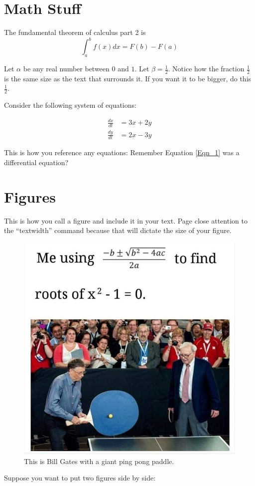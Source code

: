\documentclass[11pt]{article}
\begin{document}
\pagebreak


\section{Math Stuff}
The fundamental theorem of calculus part 2 is 
$$\int_{a}^{b} f(x) dx = F(b) - F(a) $$

\noindent Let $\alpha$ be any real number between $0$ and $1$.  Let $\beta = \frac{1}{2}$.  Notice how the fraction $\frac{1}{2}$ is the same size as the text that surrounds it.  If you want it to be bigger, do this $\displaystyle \frac{1}{2}$.  

Consider the following system of equations: 

\begin{align}
    \frac{dx}{dt} & = 3x + 2y \label{Eqn_1} \\ 
    \frac{dy}{dt} & = 2x - 3y 
\end{align}

This is how you reference any equations: Remember Equation \eqref{Eqn_1} was a differential equation? 

\section{Figures}

This is how you call a figure and include it in your text.  Page close attention to the ``textwidth'' command because that will dictate the size of your figure.  

\begin{figure}[h]
\centering
\includegraphics[width = .3\textwidth]{Figures/Histogram.jpeg}
\caption{This is Bill Gates with a giant ping pong paddle. }
\label{Bill}

\end{figure}





\pagebreak 

Suppose you want to put two figures side by side: 
\end{document}
